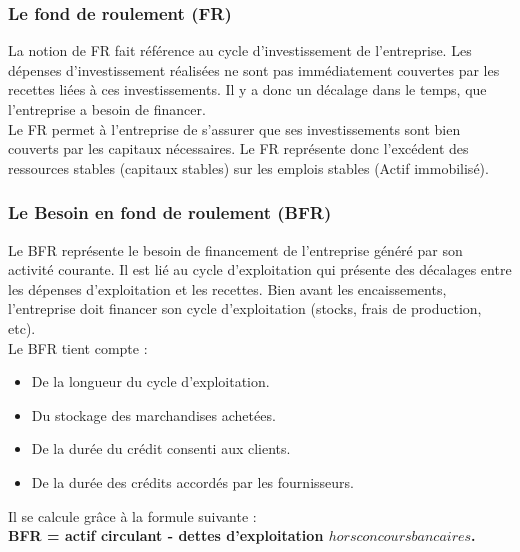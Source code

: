 \documentclass[a4paper,10pt]{article}
\begin{document}
	\subsubsection{Le fond de roulement (FR)}
La notion de FR fait référence au cycle d'investissement de l'entreprise. Les dépenses d'investissement réalisées ne sont pas immédiatement couvertes par les recettes liées à ces investissements. Il y a donc un décalage dans le temps, que l'entreprise a besoin de financer. \\
Le FR permet à l'entreprise de s'assurer que ses investissements sont bien couverts par les capitaux nécessaires. Le FR représente donc l'excédent des ressources stables (capitaux stables) sur les emplois stables (Actif immobilisé).

	\subsubsection{Le Besoin en fond de roulement (BFR)}
	Le BFR représente le besoin de financement de l'entreprise généré par son activité courante. Il est lié au cycle d'exploitation qui présente des décalages entre les dépenses d'exploitation et les recettes. Bien avant les encaissements, l'entreprise doit financer son cycle d'exploitation (stocks, frais de production, etc). \\
Le BFR tient compte : \\
\begin{itemize}
\item De la longueur du cycle d'exploitation. 
\item Du stockage des marchandises achetées. 
\item De la durée du crédit consenti aux clients. 
\item De la durée des crédits accordés par les fournisseurs. 
\end{itemize}
Il se calcule grâce à la formule suivante : \\
\textbf{  BFR = actif circulant - dettes d'exploitation  \( hors concours bancaires \).} 
\end{document}
